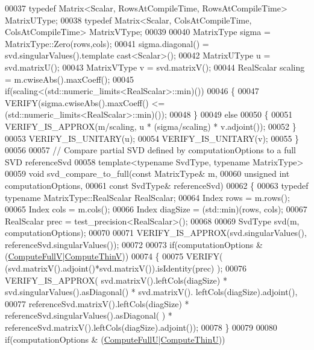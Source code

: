 \begin{DoxyCode}
00037   \textcolor{keyword}{typedef} Matrix<Scalar, RowsAtCompileTime, RowsAtCompileTime> MatrixUType;
00038   \textcolor{keyword}{typedef} Matrix<Scalar, ColsAtCompileTime, ColsAtCompileTime> MatrixVType;
00039 
00040   MatrixType sigma = MatrixType::Zero(rows,cols);
00041   sigma.diagonal() = svd.singularValues().template cast<Scalar>();
00042   MatrixUType u = svd.matrixU();
00043   MatrixVType v = svd.matrixV();
00044   RealScalar scaling = m.cwiseAbs().maxCoeff();
00045   \textcolor{keywordflow}{if}(scaling<(std::numeric\_limits<RealScalar>::min)())
00046   \{
00047     VERIFY(sigma.cwiseAbs().maxCoeff() <= (std::numeric\_limits<RealScalar>::min)());
00048   \}
00049   \textcolor{keywordflow}{else}
00050   \{
00051     VERIFY\_IS\_APPROX(m/scaling, u * (sigma/scaling) * v.adjoint());
00052   \}
00053   VERIFY\_IS\_UNITARY(u);
00054   VERIFY\_IS\_UNITARY(v);
00055 \}
00056 
00057 \textcolor{comment}{// Compare partial SVD defined by computationOptions to a full SVD referenceSvd}
00058 \textcolor{keyword}{template}<\textcolor{keyword}{typename} SvdType, \textcolor{keyword}{typename} MatrixType>
00059 \textcolor{keywordtype}{void} svd\_compare\_to\_full(\textcolor{keyword}{const} MatrixType& m,
00060                          \textcolor{keywordtype}{unsigned} \textcolor{keywordtype}{int} computationOptions,
00061                          \textcolor{keyword}{const} SvdType& referenceSvd)
00062 \{
00063   \textcolor{keyword}{typedef} \textcolor{keyword}{typename} MatrixType::RealScalar RealScalar;
00064   Index rows = m.rows();
00065   Index cols = m.cols();
00066   Index diagSize = (std::min)(rows, cols);
00067   RealScalar prec = test\_precision<RealScalar>();
00068 
00069   SvdType svd(m, computationOptions);
00070 
00071   VERIFY\_IS\_APPROX(svd.singularValues(), referenceSvd.singularValues());
00072   
00073   \textcolor{keywordflow}{if}(computationOptions & (\hyperlink{group__enums_ggae3e239fb70022eb8747994cf5d68b4a9a52c6f7e80bbf9a42297c88f700245b51}{ComputeFullV}|\hyperlink{group__enums_ggae3e239fb70022eb8747994cf5d68b4a9a1055e53fa95c8ae04a07ebb72cfafd95}{ComputeThinV}))
00074   \{
00075     VERIFY( (svd.matrixV().adjoint()*svd.matrixV()).isIdentity(prec) );
00076     VERIFY\_IS\_APPROX( svd.matrixV().leftCols(diagSize) * svd.singularValues().asDiagonal() * svd.matrixV().
      leftCols(diagSize).adjoint(),
00077                       referenceSvd.matrixV().leftCols(diagSize) * referenceSvd.singularValues().asDiagonal(
      ) * referenceSvd.matrixV().leftCols(diagSize).adjoint());
00078   \}
00079   
00080   \textcolor{keywordflow}{if}(computationOptions & (\hyperlink{group__enums_ggae3e239fb70022eb8747994cf5d68b4a9a2b4f91ca5859a4159dbfe8090043817f}{ComputeFullU}|\hyperlink{group__enums_ggae3e239fb70022eb8747994cf5d68b4a9af8c742a1aa87773e165eae406c9ccaf8}{ComputeThinU}))

\end{DoxyCode}
